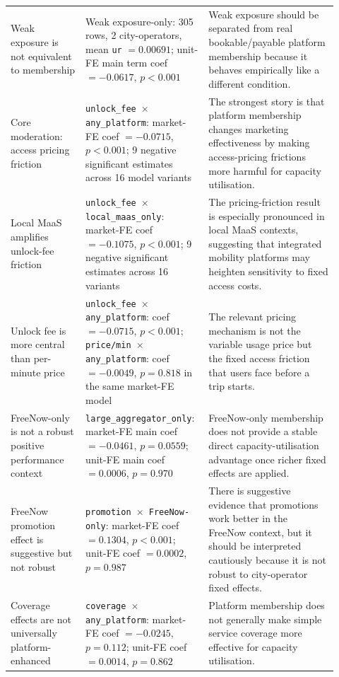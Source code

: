 \documentclass[11pt]{article}
\newcommand{\code}[1]{\texttt{\small #1}}
\begin{document}
\begin{landscape}
\begin{longtable}{L{0.22\linewidth} L{0.32\linewidth} L{0.38\linewidth}}
Weak exposure is not equivalent to membership &
Weak exposure-only: 305 rows, 2 city-operators, mean \code{ur} $=0.00691$; unit-FE main term coef $=-0.0617$, $p<0.001$ &
Weak exposure should be separated from real bookable/payable platform membership because it behaves empirically like a different condition. \\

Core moderation: access pricing friction &
\code{unlock\_fee $\times$ any\_platform}: market-FE coef $=-0.0715$, $p<0.001$; 9 negative significant estimates across 16 model variants &
The strongest story is that platform membership changes marketing effectiveness by making access-pricing frictions more harmful for capacity utilisation. \\

Local MaaS amplifies unlock-fee friction &
\code{unlock\_fee $\times$ local\_maas\_only}: market-FE coef $=-0.1075$, $p<0.001$; 9 negative significant estimates across 16 variants &
The pricing-friction result is especially pronounced in local MaaS contexts, suggesting that integrated mobility platforms may heighten sensitivity to fixed access costs. \\

Unlock fee is more central than per-minute price &
\code{unlock\_fee $\times$ any\_platform}: coef $=-0.0715$, $p<0.001$; \code{price/min $\times$ any\_platform}: coef $=-0.0049$, $p=0.818$ in the same market-FE model &
The relevant pricing mechanism is not the variable usage price but the fixed access friction that users face before a trip starts. \\

FreeNow-only is not a robust positive performance context &
\code{large\_aggregator\_only}: market-FE main coef $=-0.0461$, $p=0.0559$; unit-FE main coef $=0.0006$, $p=0.970$ &
FreeNow-only membership does not provide a stable direct capacity-utilisation advantage once richer fixed effects are applied. \\

FreeNow promotion effect is suggestive but not robust &
\code{promotion $\times$ FreeNow-only}: market-FE coef $=0.1304$, $p<0.001$; unit-FE coef $=0.0002$, $p=0.987$ &
There is suggestive evidence that promotions work better in the FreeNow context, but it should be interpreted cautiously because it is not robust to city-operator fixed effects. \\

Coverage effects are not universally platform-enhanced &
\code{coverage $\times$ any\_platform}: market-FE coef $=-0.0245$, $p=0.112$; unit-FE coef $=0.0014$, $p=0.862$ &
Platform membership does not generally make simple service coverage more effective for capacity utilisation. \\


\end{longtable}
\end{landscape}
\end{document}
